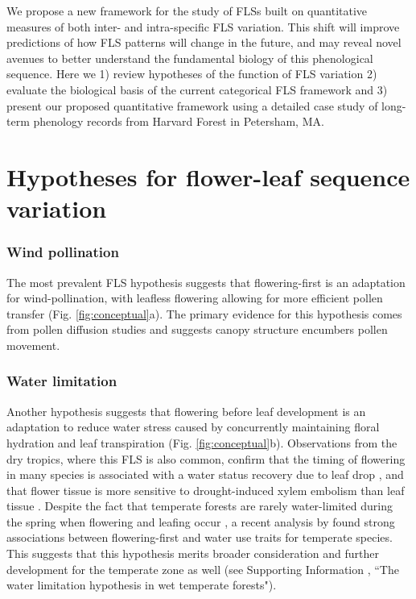 \documentclass[11pt]{article}
\begin{document}
\noindent We propose a new framework for the study of FLSs built on quantitative measures of both inter- and intra-specific FLS variation. This shift will improve predictions of how FLS patterns will change in the future, and  may reveal novel avenues to better understand the fundamental biology of this phenological sequence. Here we 1) review hypotheses of the function of FLS variation 2) evaluate the biological basis of the current categorical FLS framework and 3) present our proposed quantitative framework using a detailed case study of long-term phenology records from Harvard Forest in Petersham, MA.

\section*{Hypotheses for flower-leaf sequence variation}
\subsubsection*{ Wind pollination}
\noindent The most prevalent FLS hypothesis suggests that flowering-first is an adaptation for wind-pollination, with leafless flowering allowing for more efficient pollen transfer \citep{Whitehead1969}(Fig. \ref{fig:conceptual}a). The primary evidence for this hypothesis comes from pollen diffusion studies \citep[e.g., particle movement through closed and open canopies,][]{Niklas1985, Milleron2012} and suggests canopy structure encumbers pollen movement.
\subsubsection*{Water limitation}
\noindent Another hypothesis suggests that flowering before leaf development is an adaptation to reduce water stress caused by concurrently maintaining floral hydration and leaf transpiration \citep{Franklin2016} (Fig. \ref{fig:conceptual}b). Observations from the dry tropics, where this FLS is also common, confirm that the timing of flowering in many species is associated with a water status recovery due to leaf drop \citep{Borchert1983,Reich1984}, and that flower tissue is more sensitive to drought-induced xylem embolism than leaf tissue \citep{Zhang2017}. Despite the fact that temperate forests are rarely water-limited during the spring when flowering and leafing occur \citep{Polgar2011}, a recent analysis by \citet{Gougherty2018} found strong associations between flowering-first and water use traits for temperate species. This suggests that this hypothesis merits broader consideration and further development for the temperate zone as well (see Supporting Information , ``The water limitation hypothesis in wet temperate forests"). 
 
\end{document}
